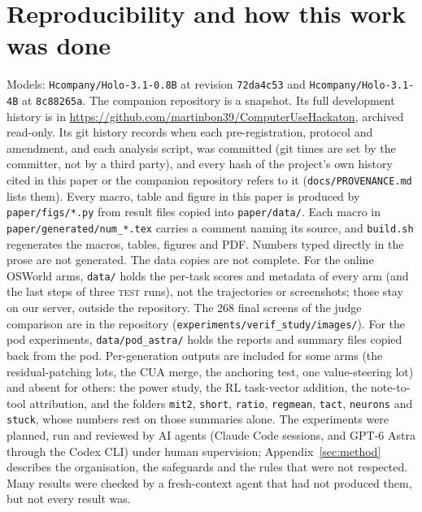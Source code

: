 \section{Reproducibility and how this work was done}
\label{sec:repro}
Models: \texttt{Hcompany/Holo-3.1-0.8B} at revision \texttt{72da4c53} and \texttt{Hcompany/Holo-3.1-4B} at \texttt{8c88265a}. %
The companion repository is a snapshot. Its full development history is in \url{https://github.com/martinbon39/ComputerUseHackaton}, archived read-only. Its git history records when each pre-registration, protocol and amendment, and each analysis script, was committed (git times are set by the committer, not by a third party), and every hash of the project's own history cited in this paper or the companion repository refers to it (\texttt{docs/PROVENANCE.md} lists them). %
Every macro, table and figure in this paper is produced by \texttt{paper/figs/*.py} from result files copied into \texttt{paper/data/}. Each macro in \texttt{paper/generated/num\_*.tex} carries a comment naming its source, and \texttt{build.sh} regenerates the macros, tables, figures and PDF. Numbers typed directly in the prose are not generated. %
The data copies are not complete. For the online OSWorld arms, \texttt{data/} holds the per-task scores and metadata of every arm (and the last steps of three \textsc{test} runs), not the trajectories or screenshots; those stay on our server, outside the repository. The 268 final screens of the judge comparison are in the repository (\texttt{experiments/verif\_study/images/}). For the pod experiments, \texttt{data/pod\_astra/} holds the reports and summary files copied back from the pod. Per-generation outputs are included for some arms (the residual-patching lots, the CUA merge, the anchoring test, one value-steering lot) and absent for others: the power study, the RL task-vector addition, the note-to-tool attribution, and the folders \texttt{mit2}, \texttt{short}, \texttt{ratio}, \texttt{regmean}, \texttt{tact}, \texttt{neurons} and \texttt{stuck}, whose numbers rest on those summaries alone. %
The experiments were planned, run and reviewed by AI agents (Claude Code sessions, and GPT-6 Astra through the Codex CLI) under human supervision; Appendix~\ref{sec:method} describes the organisation, the safeguards and the rules that were not respected. Many results were checked by a fresh-context agent that had not produced them, but not every result was. %

